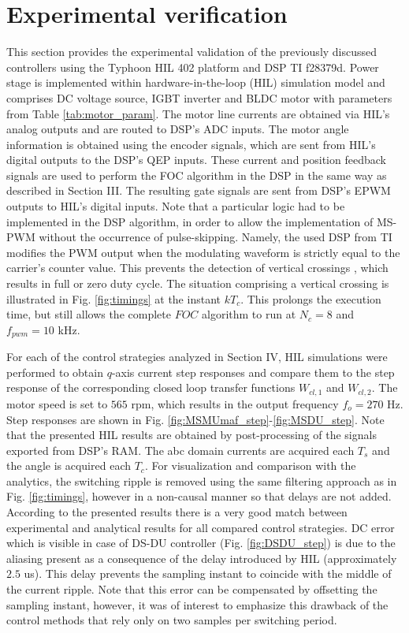 \documentclass[conference]{IEEEtran}
\begin{document}
\section{Experimental verification}
This section provides the experimental validation of the previously discussed controllers using the Typhoon HIL 402 platform and DSP TI f28379d. Power stage is implemented within hardware-in-the-loop (HIL) simulation model and comprises DC voltage source, IGBT inverter and BLDC motor with parameters from Table \ref{tab:motor_param}. The motor line currents are obtained via HIL’s analog outputs and are routed to DSP's ADC inputs. The motor angle information is obtained using the encoder signals, which are sent from HIL’s digital outputs to the DSP's QEP inputs. These current and position feedback signals are used to perform the FOC algorithm in the DSP in the same way as described in Section III. The resulting gate signals are sent from DSP’s EPWM outputs to HIL's digital inputs. 
Note that a particular logic had to be implemented in the DSP algorithm, in order to allow the implementation of MS-PWM without the occurrence of pulse-skipping. Namely, the used DSP from TI modifies the PWM output when the modulating waveform is strictly equal to the carrier's counter value. This prevents the detection of vertical crossings \cite{corradini2018}, which results in full or zero duty cycle. The situation comprising a vertical crossing is illustrated in Fig. \ref{fig:timings} at the instant $kT_c$.
This prolongs the execution time, but still allows the complete $FOC$ algorithm to run at $N_c=8$ and $f_{pwm} = 10$ kHz.

For each of the control strategies analyzed in Section IV, HIL simulations were performed to obtain $q$-axis current step responses and compare them to the step response of the corresponding closed loop transfer functions $W_{cl,1}$ and $W_{cl,2}$. The motor speed is set to $565$ rpm, which results in the output frequency $f_o=270$ Hz. 
Step responses are shown in Fig. \ref{fig:MSMUmaf_step}-\ref{fig:MSDU_step}. Note that the presented HIL results are obtained by post-processing of the signals exported from DSP’s RAM. The abc domain currents are acquired each $T_s$ and the angle is acquired each $T_c$. 
For visualization and comparison with the analytics, the switching ripple is removed using the same filtering approach as in Fig. \ref{fig:timings}, however in a non-causal manner so that delays are not added.
According to the presented results there is a very good match between experimental and analytical results for all compared control strategies. DC error which is visible in case of DS-DU controller (Fig. \ref{fig:DSDU_step}) is due to the aliasing present as a consequence of the delay introduced by HIL (approximately $2.5$ us). This delay prevents the sampling instant to coincide with the middle of the current ripple. Note that this error can be compensated by offsetting the sampling instant, however, it was of interest to emphasize this drawback of the control methods that rely only on two samples per switching period. 
\end{document}
